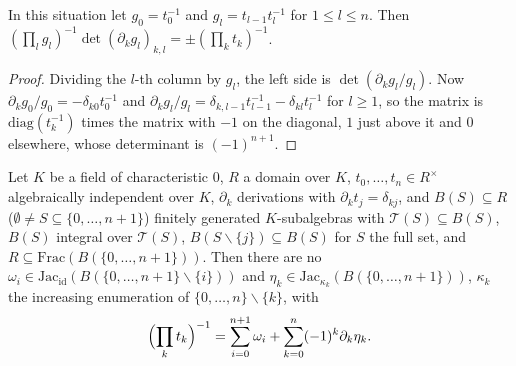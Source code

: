 \begin{lemma}\label{pf:steps1:dlogratios}
In this situation let $g_0=t_0^{-1}$ and $g_l=t_{l-1}t_l^{-1}$ for $1\le l\le n$. Then
$(\prod_lg_l)^{-1}\det(\partial_kg_l)_{k,l}=\pm(\prod_kt_k)^{-1}$.
\end{lemma}

\begin{proof}
Dividing the $l$-th column by $g_l$, the left side is $\det(\partial_kg_l/g_l)$. Now $\partial_kg_0/g_0=-\delta_{k0}t_0^{-1}$ and
$\partial_kg_l/g_l=\delta_{k,l-1}t_{l-1}^{-1}-\delta_{kl}t_l^{-1}$ for $l\ge1$, so the matrix is $\mathrm{diag}(t_k^{-1})$ times the
matrix with $-1$ on the diagonal, $1$ just above it and $0$ elsewhere, whose determinant is $(-1)^{n+1}$.
\end{proof}

\begin{lemma}[Residues]\label{pf:steps1:resid}
Let $K$ be a field of characteristic $0$, $R$ a domain over $K$, $t_0,\dots,t_n\in R^\times$ algebraically independent over $K$,
$\partial_k$ derivations with $\partial_kt_j=\delta_{kj}$, and $B(S)\subseteq R$ ($\emptyset\ne S\subseteq\{0,\dots,n+1\}$)
finitely generated $K$-subalgebras with $\mathcal T(S)\subseteq B(S)$, $B(S)$ integral over $\mathcal T(S)$,
$B(S\smallsetminus\{j\})\subseteq B(S)$ for $S$ the full set, and $R\subseteq\mathrm{Frac}(B(\{0,\dots,n+1\}))$. Then there are no
$\omega_i\in\mathrm{Jac}_{\mathrm{id}}(B(\{0,\dots,n+1\}\smallsetminus\{i\}))$ and
$\eta_k\in\mathrm{Jac}_{\kappa_k}(B(\{0,\dots,n+1\}))$, $\kappa_k$ the increasing enumeration of $\{0,\dots,n\}\smallsetminus\{k\}$,
with
\[
 \Bigl(\prod_kt_k\Bigr)^{-1}=\sum_{i=0}^{n+1}\omega_i+\sum_{k=0}^n(-1)^k\partial_k\eta_k .
\]
\end{lemma}

